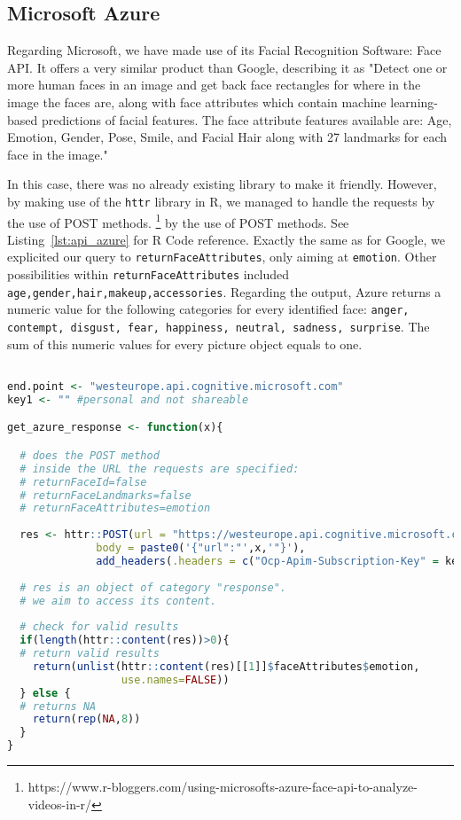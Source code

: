 \subsection{Microsoft Azure}
Regarding Microsoft, we have made use of its Facial Recognition Software: Face API. It offers a very similar product than Google, describing it as "Detect one or more human faces in an image and get back face rectangles for where in the image the faces are, along with face attributes which contain machine learning-based predictions of facial features. The face attribute features available are: Age, Emotion, Gender, Pose, Smile, and Facial Hair along with 27 landmarks for each face in the image." \par
%
In this case, there was no already existing library to make it friendly. However, by making use of the \texttt{httr} library in R, we managed to handle the requests by the use of POST methods.
\footnote{https://www.r-bloggers.com/using-microsofts-azure-face-api-to-analyze-videos-in-r/} by the use of POST methods. See Listing~\ref{lst:api_azure} for R Code reference.
%
Exactly the same as for Google, we explicited our query to \texttt{returnFaceAttributes}, only aiming at \texttt{emotion}. Other possibilities within \texttt{returnFaceAttributes} included \texttt{age,gender,hair,makeup,accessories}.
Regarding the output, Azure returns a numeric value for the following categories for every identified face: \texttt{anger, contempt, disgust, fear, happiness, neutral, sadness, surprise}. The sum of this numeric values for every picture object equals to one.


\begin{lstlisting}[language={R}, frame={single}, label={lst:api_azure}, caption={R Code to call the Google API and store the results}]

end.point <- "westeurope.api.cognitive.microsoft.com"
key1 <- "" #personal and not shareable

get_azure_response <- function(x){

  # does the POST method
  # inside the URL the requests are specified:
  # returnFaceId=false
  # returnFaceLandmarks=false
  # returnFaceAttributes=emotion
  
  res <- httr::POST(url = "https://westeurope.api.cognitive.microsoft.com/face/v1.0/detect?returnFaceId=false&returnFaceLandmarks=false&returnFaceAttributes=emotion",
              body = paste0('{"url":"',x,'"}'),
              add_headers(.headers = c("Ocp-Apim-Subscription-Key" = key1)))
  
  # res is an object of category "response".
  # we aim to access its content.
  
  # check for valid results
  if(length(httr::content(res))>0){
  # return valid results
    return(unlist(httr::content(res)[[1]]$faceAttributes$emotion,
                  use.names=FALSE))  
  } else {
  # returns NA
    return(rep(NA,8))
  }
}  

\end{lstlisting}

